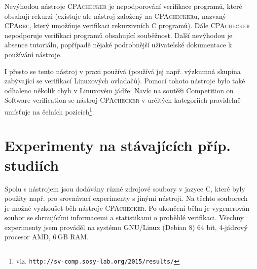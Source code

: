 \documentclass[a4paper,12pt]{article}
\begin{document}
Nevýhodou nástroje \textsc{CPAchecker} je nepodporování verifikace programů, které obsahují rekurzi (existuje
ale nástroj založený na \textsc{CPAchecker}u, nazvaný \textsc{CPArec}, který umožňuje verifikaci rekurzivních C programů). 
Dále \textsc{CPAchecker} nepodporuje verifikaci programů obsahující souběžnost. Další nevýhodou je absence tutoriálu,
popřípadě nějaké podrobnější uživatelské dokumentace k používání nástroje.

I přesto se tento nástroj v praxi používá (používá jej např. výzkumná skupina zabývající se verifikací Linuxových
ovladačů). Pomocí tohoto nástroje bylo také odhaleno několik chyb v Linuxovém jádře. Navíc na 
soutěži Competition on Software verification se nástroj \textsc{CPAchecker} v určitých kategoriích pravidelně 
umísťuje na čelních pozicích\footnote{viz. \texttt{http://sv-comp.sosy-lab.org/2015/results/}}.

\section{Experimenty na stávajících příp. studiích}
Spolu s nástrojem jsou dodávány různé zdrojové soubory v jazyce C, které byly použity např. pro srovnávací experimenty
s jinými nástroji. Na těchto souborech je možné vyzkoušet běh nástroje \textsc{CPAchecker}. Po ukončení běhu je vygenerován
soubor se shrnujícími informacemi a statistikami o proběhlé verifikaci. Všechny experimenty jsem prováděl na systému
GNU/Linux (Debian 8) 64 bit, 4-jádrový procesor AMD, 6\,GB RAM.
\end{document}

